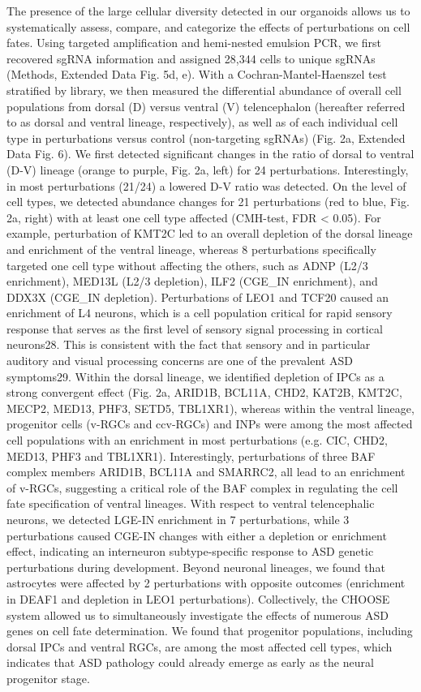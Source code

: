 The presence of the large cellular diversity detected in our organoids allows us to systematically assess, compare, and categorize the effects of perturbations on cell fates. Using targeted amplification and hemi-nested emulsion PCR, we first recovered sgRNA information and assigned 28,344 cells to unique sgRNAs (Methods, Extended Data Fig. 5d, e). With a Cochran-Mantel-Haenszel test stratified by library, we then measured the differential abundance of overall cell populations from dorsal (D) versus ventral (V) telencephalon (hereafter referred to as dorsal and ventral lineage, respectively), as well as of each individual cell type in perturbations versus control (non-targeting sgRNAs) (Fig. 2a, Extended Data Fig. 6). 
We first detected significant changes in the ratio of dorsal to ventral (D-V) lineage (orange to purple, Fig. 2a, left) for 24 perturbations. Interestingly, in most perturbations (21/24) a lowered D-V ratio was detected. On the level of cell types, we detected abundance changes for 21 perturbations (red to blue, Fig. 2a, right) with at least one cell type affected (CMH-test, FDR < 0.05). For example, perturbation of KMT2C led to an overall depletion of the dorsal lineage and enrichment of the ventral lineage, whereas 8 perturbations specifically targeted one cell type without affecting the others, such as ADNP (L2/3 enrichment), MED13L (L2/3 depletion), ILF2 (CGE\_IN enrichment), and DDX3X (CGE\_IN depletion). Perturbations of LEO1 and TCF20 caused an enrichment of L4 neurons, which is a cell population critical for rapid sensory response that serves as the first level of sensory signal processing in cortical neurons28. This is consistent with the fact that sensory and in particular auditory and visual processing concerns are one of the prevalent ASD symptoms29. 
Within the dorsal lineage, we identified depletion of IPCs as a strong convergent effect (Fig. 2a, ARID1B, BCL11A, CHD2, KAT2B, KMT2C, MECP2, MED13, PHF3, SETD5, TBL1XR1), whereas within the ventral lineage, progenitor cells (v-RGCs and ccv-RGCs) and INPs were among the most affected cell populations with an enrichment in most perturbations (e.g. CIC, CHD2, MED13, PHF3 and TBL1XR1). Interestingly, perturbations of three BAF complex members ARID1B, BCL11A and SMARRC2, all lead to an enrichment of v-RGCs, suggesting a critical role of the BAF complex in regulating the cell fate specification of ventral lineages. With respect to ventral telencephalic neurons, we detected LGE-IN enrichment in 7 perturbations, while 3 perturbations caused CGE-IN changes with either a depletion or enrichment effect, indicating an interneuron subtype-specific response to ASD genetic perturbations during development. Beyond neuronal lineages, we found that astrocytes were affected by 2 perturbations with opposite outcomes (enrichment in DEAF1 and depletion in LEO1 perturbations). 
Collectively, the CHOOSE system allowed us to simultaneously investigate the effects of numerous ASD genes on cell fate determination. We found that progenitor populations, including dorsal IPCs and ventral RGCs, are among the most affected cell types, which indicates that ASD pathology could already emerge as early as the neural progenitor stage.  

